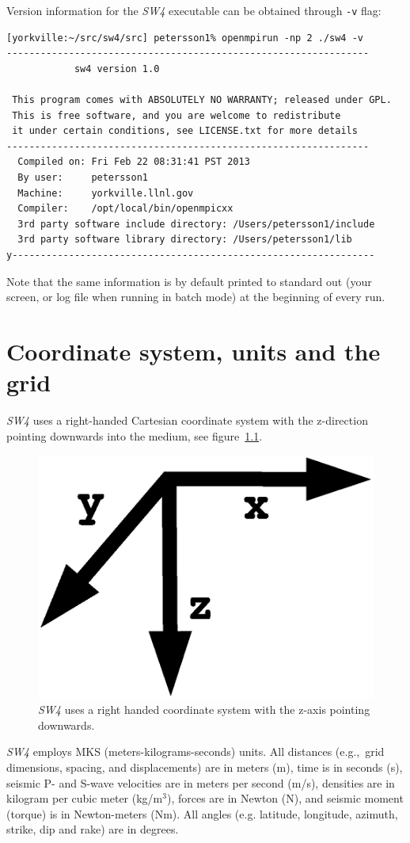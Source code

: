 \documentclass[11pt]{report}
\begin{document}
Version information for the \emph{SW4} executable can be obtained through {\tt -v} flag:
\begin{verbatim}
[yorkville:~/src/sw4/src] petersson1% openmpirun -np 2 ./sw4 -v
----------------------------------------------------------------
            sw4 version 1.0

 This program comes with ABSOLUTELY NO WARRANTY; released under GPL.
 This is free software, and you are welcome to redistribute     
 it under certain conditions, see LICENSE.txt for more details  
----------------------------------------------------------------
  Compiled on: Fri Feb 22 08:31:41 PST 2013
  By user:     petersson1
  Machine:     yorkville.llnl.gov
  Compiler:    /opt/local/bin/openmpicxx
  3rd party software include directory: /Users/petersson1/include
  3rd party software library directory: /Users/petersson1/lib
y----------------------------------------------------------------
\end{verbatim}
Note that the same information is by default printed to standard out (your screen, or log file when
running in batch mode) at the beginning of every run.

\chapter{Coordinate system, units and the grid}
%
\emph{SW4} uses a right-handed Cartesian coordinate system with the z-direction pointing
downwards into the medium, see figure~\ref{fig:coordsys}. 
\begin{figure}[th]
\begin{centering}
 \includegraphics[height=0.2\linewidth]{rightHandedCoord.ps}
  \caption{\emph{SW4} uses a right handed coordinate system with the z-axis pointing
  downwards.}
  \label{fig:coordsys}
\end{centering}
\end{figure}
\emph{SW4} employs MKS (meters-kilograms-seconds) units. All distances (e.g.,~grid dimensions,
spacing, and displacements) are in meters (m), time is in seconds (s), seismic P- and S-wave
velocities are in meters per second (m/s), densities are in kilogram per cubic meter (kg/m$^3$),
forces are in Newton (N), and seismic moment (torque) is in Newton-meters (Nm). All angles
(e.g. latitude, longitude, azimuth, strike, dip and rake) are in degrees. 
\end{document}
